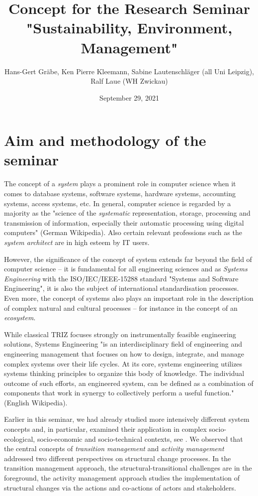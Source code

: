 \documentclass[11pt,a4paper]{article}
\title{Concept for the Research Seminar\\ "Sustainability, Environment,
  Management"}
\author{Hans-Gert Gr\"abe, Ken Pierre Kleemann, Sabine Lautenschläger (all
  Uni Leipzig),\\ Ralf Laue (WH Zwickau) }
\date{September 29, 2021}
\begin{document}
\maketitle

\section{Aim and methodology of the seminar}

The concept of a \emph{system} plays a prominent role in computer science when
it comes to database systems, software systems, hardware systems, accounting
systems, access systems, etc.  In general, computer science is regarded by a
majority as the "science of the \emph{systematic} representation, storage,
processing and transmission of information, especially their automatic
processing using digital computers" (German Wikipedia).  Also certain relevant
professions such as the \emph{system architect} are in high esteem by IT
users.

However, the significance of the concept of system extends far beyond the
field of computer science -- it is fundamental for all engineering sciences
and as \emph{Systems Engineering} with the ISO/IEC/IEEE-15288 standard
"Systems and Software Engineering", it is also the subject of international
standardisation processes.  Even more, the concept of systems also plays an
important role in the description of complex natural and cultural processes --
for instance in the concept of an \emph{ecosystem}.

While classical TRIZ focuses strongly on instrumentally feasible engineering
solutions, Systems Engineering "is an interdisciplinary field of engineering
and engineering management that focuses on how to design, integrate, and
manage complex systems over their life cycles. At its core, systems
engineering utilizes systems thinking principles to organize this body of
knowledge. The individual outcome of such efforts, an engineered system, can
be defined as a combination of components that work in synergy to collectively
perform a useful function." (English Wikipedia). 

Earlier in this seminar, we had already studied more intensively different
system concepts and, in particular, examined their application in complex
socio-ecological, socio-economic and socio-technical contexts, see
\cite{Graebe2020}. We observed that the central concepts of \emph{transition
  management} and \emph{activity management} addressed two different
perspectives on structural change processes. In the transition management
approach, the structural-transitional challenges are in the foreground, the
activity management approach studies the implementation of structural changes
via the actions and co-actions of actors and stakeholders.
\end{document}

